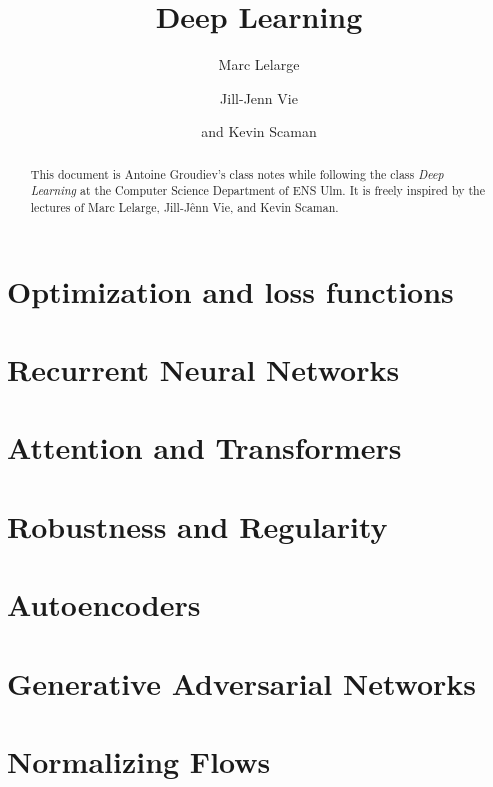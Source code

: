 \documentclass[toc, titlepaged]{../cs-classes/cs-classes}
\title{Deep Learning}
\author{Marc Lelarge\and Jill-Jenn Vie\and and Kevin Scaman}
\begin{document}
\begin{abstract}
    This document is Antoine Groudiev's class notes while following the class \emph{Deep Learning} at the Computer Science Department of ENS Ulm. It is freely inspired by the lectures of Marc Lelarge, Jill-Jênn Vie, and Kevin Scaman. 
\end{abstract}





% 
\section{Optimization and loss functions}



\section{Recurrent Neural Networks}

\section{Attention and Transformers}

\section{Robustness and Regularity}



\section{Autoencoders}

\section{Generative Adversarial Networks}

\section{Normalizing Flows}
\end{document}
